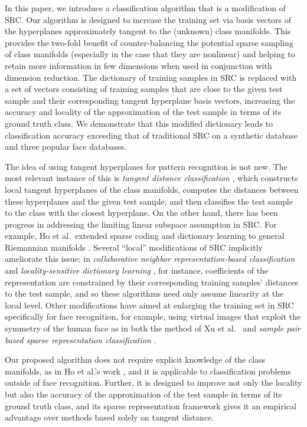 \documentclass[review]{elsarticle}
\begin{document}
In this paper, we introduce a classification algorithm that is a modification of SRC. Our algorithm is designed to increase the training set via basis vectors of the hyperplanes approximately tangent to the (unknown) class manifolds. This provides the two-fold benefit of counter-balancing the potential sparse sampling of class manifolds (especially in the case that they are nonlinear) and helping to retain more information in few dimensions when used in conjunction with dimension reduction. The dictionary of training samples in SRC is replaced with a set of vectors consisting of training samples that are close to the given test sample and their corresponding tangent hyperplane basis vectors, increasing the accuracy and locality of the approximation of the test sample in terms of its ground truth class. We demonstrate that this modified dictionary leads to classification accuracy exceeding that of traditional SRC on a synthetic database and three popular face databases.



The idea of using tangent hyperplanes for pattern recognition is not new. The most relevant instance of this is \emph{tangent distance classification} \cite{sim:tdc,cha:tdc,yan:ltd}, which constructs local tangent hyperplanes of the class manifolds, computes the distances between these hyperplanes and the given test sample, and then classifies the test sample to the class with the closest hyperplane. On the other hand, there has been progress in addressing the limiting linear subspace assumption in SRC. For example, Ho et al.\ extended sparse coding and dictionary learning to general Riemannian manifolds \cite{xie:nlsrc}. Several ``local'' modifications of SRC implicitly ameliorate this issue; in \emph{collaborative neighbor representation-based classification} \cite{waq:cnrc} and \emph{locality-sensitive dictionary learning} \cite{wei:lsdl}, for instance, coefficients of the representation are constrained by their corresponding training samples' distances to the test sample, and so these algorithms need only assume linearity at the local level. Other modifications have aimed at enlarging the training set in SRC specifically for face recognition, for example, using virtual images that exploit the symmetry of the human face as in both the method of Xu et al.\ \cite{xu:mir} and \emph{sample pair based sparse representation classification} \cite{zha:spsrc}. 

Our proposed algorithm does not require explicit knowledge of the class manifolds, as in Ho et al.'s work \cite{xie:nlsrc}, and it is applicable to classification problems outside of face recognition. Further, it is designed to improve not only the locality but also the accuracy of the approximation of the test sample in terms of its ground truth class, and its sparse representation framework gives it an empirical advantage over methods based solely on tangent distance.
\end{document}
